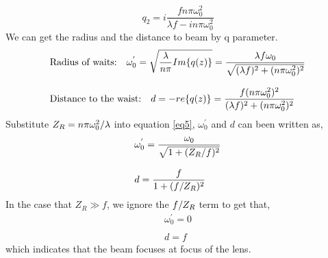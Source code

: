 \documentclass{article}
\begin{document}
\begin{equation}\label{eq4}
q_2=i\dfrac{fn\pi\omega_{0}^{2}}{\lambda f-in\pi\omega_{0}^{2}}
\end{equation}
We can get the radius and the distance to beam by q parameter.
\begin{equation}\label{eq11}
\begin{array}{l}
\text{Radius of waits:\quad}\omega_{0}^{'}=\sqrt{\dfrac{\lambda}{n\pi}Im\{q{(z)\}}}=\dfrac{\lambda f\omega_{0}}{\sqrt{(\lambda f)^2+(n\pi\omega_0^{2})^2}}

\\
\\
\text{Distance to the waist:\quad} d=-re\{q(z)\}=\dfrac{f(n\pi\omega_0^{2})^2}{(\lambda f)^2+(n\pi\omega_{0}^{2})^2}
\end{array}
\end{equation}
Substitute $ Z_R=n\pi\omega_{0}^{2}\//\lambda $ into equation \ref{eq5}, $\omega_{0}^{'} $ and $ d $ can been written as,
\begin{equation}\label{eq12}
\begin{array}{l}
\omega_{0}^{'}=\dfrac{\omega_0}{\sqrt{1+(Z_R\//f)^2}}
\\
\\
d=\dfrac{f}{1+(f\//Z_R)^2}
\end{array}
\end{equation}
In the case that $ Z_R\gg f $, we ignore the $ f\//Z_R $ term to get that,
\begin{equation}\label{eq13}
\begin{array}{l}
\omega_{0}^{'}=0
\\
\\
d=f
\end{array}
\end{equation}
which indicates that the beam focuses at focus of the lens.
\end{document}
